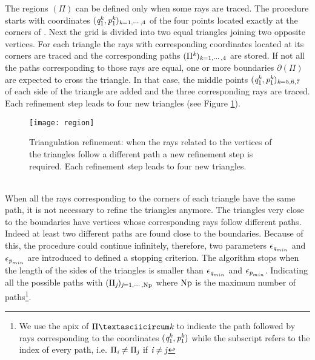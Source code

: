 The regions $(\Pi)$ can be defined only when some rays are traced.
The procedure starts with coordinates $(\textit{q}_1^{\textit{k}},\textit{p}_1^{\textit{k}})_{\textit{k}=1, \cdots, 4}$ of the four points located exactly at the corners of .
Next the grid is divided into two equal triangles joining two opposite vertices. For each triangle the rays with corresponding coordinates located at its corners are traced and the corresponding paths $(\Pi^{\textit{k}})_{\textit{k}=1, \cdots, 4}$ are stored.
If not all the paths corresponding to
those rays are equal, one or more boundaries
$\partial$$(\Pi)$ are expected to cross the triangle.
In that case, the middle points $(\textit{q}_1^{\textit{k}},\textit{p}_1^{\textit{k}})_{\textit{k}=5,6,7}$ of each side of the triangle are added and
the three corresponding rays are traced. Each refinement step leads to four new triangles (see Figure \ref{fig:refinement}).
 \begin{figure}[h]
  \begin{center}
  \texttt{[image: region]}
  \end{center}
  \caption{Triangulation refinement:
  when the rays related to the vertices of the triangles follow a different path a new refinement step is required.
   Each refinement step leads to four new triangles.}
  \label{fig:refinement}
\end{figure}
  \\ \indent
When all the rays corresponding to the corners of each triangle have the same path, it is not necessary to refine the triangles anymore.
The triangles very close to the boundaries have vertices whose corresponding rays follow different paths.
Indeed at least two different paths are found close to the boundaries. Because of this, the procedure could continue infinitely, therefore, two parameters $\epsilon_{\textit{q}_{min}}$ and $\epsilon_{\textit{p}_{min}}$ are introduced to defined a stopping criterion.
The algorithm stops when the length of the sides of the triangles is smaller than $\epsilon_{\textit{q}_{min}}$ and $\epsilon_{\textit{p}_{min}}$.
Indicating all the possible paths with $(\Pi_{\textit{j}})_{\textit{j}=1, \cdots, \textrm{Np}}$ where $\textrm{Np}$ is the maximum number of paths\footnote{We use the apix  of $\Piˆ{\variabile{k}}$ to indicate the path followed by rays corresponding to the coordinates $(\textit{q}_1^{\textit{k}},\textit{p}_1^{\textit{k}})$ while the subscript refers to the index of every path, i.e. $\Pi_{\textit{i}}\neq\Pi_{\textit{j}}$ if $\textit{i}\neq\textit{j}$}.
